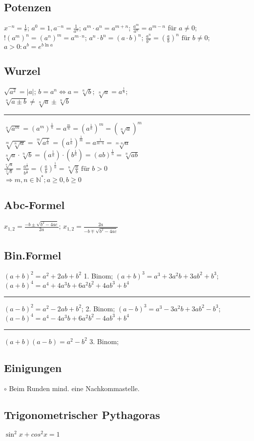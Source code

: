 \subsection{Potenzen}
$ x^{-n} = \frac{1}{^n} $; 
$ a^0 = 1, a^{-n} = \frac{1}{a^n} $; 
$ a^m \cdot a^n  = a^{m+n} $; 
$ \frac{a^m}{a^n} = a^{m-n} $ für $ a \ne 0 $; 
$ ! (a^m)^n = (a^n)^m = a^{m \cdot n} $; 
$ a^n \cdot b^n = (a \cdot b)^n $; 
$ \frac{a^n}{b^n} = (\frac{a}{b})^n \text{ für } b \ne  0 $; 
$ a >0 : a^b = e^{b \ln a} $

\subsection{Wurzel}
$ \sqrt{a ^2} = |a| $;
$ b = a^n  \Leftrightarrow a = \sqrt[n]{b}$; 
$ \sqrt[n]{a} = a^{\frac{1}{n}} $; \\
$ \sqrt[n]{a \pm b} \ne \sqrt[n]{a} \pm \sqrt[n]{b} $ \\
\hrule
$ \sqrt[n]{a^m} = (a^m)^{\frac{1}{n}} = a^{\frac{m}{n}} = (a^\frac{1}{n})^m = (\sqrt[n]{a})^m $ \\
$\sqrt[m]{\sqrt[n]{a}} = \sqrt[m]{a^{\frac{1}{n}}} = (a^{\frac{1}{n}})^{\frac{1}{m}} = a^{\frac{1}{m \cdot n}} = \sqrt[m \cdot n ]{a} $\\
$ \sqrt[n]{a} \cdot \sqrt[n]{b} = (a^{\frac{1}{n}}) \cdot (b^{\frac{1}{n}})  = (ab)^{\frac{1}{n}} = \sqrt[n]{ab} $\\
$ \frac{\sqrt[n]{a}}{\sqrt[n]{b}} = \frac{a^{\frac{1}{n}}}{b^{\frac{1}{n}}} = (\frac{a}{b})^{\frac{1}{n}} = \sqrt[n]{\frac{a}{b}} \text{ für } b > 0 $\\
$\Rightarrow m , n \in \mathbb{N}^*; a \ge  0, b \ge 0 $
\subsection{Abc-Formel}
$ x_{1,2} = \frac{-b \pm \sqrt{b^2 - 4ac}}{2a} $; 
$ x_{1,2} = \frac{2a}{-b \mp \sqrt{b^2 -4ac}} $
\subsection{Bin.Formel}
$ (a + b)^2 = a^2 + 2ab + b^2 $ 1. Binom;
$ (a+b)^3 = a^3 + 3a^2b + 3ab^2 + b^3 $; 
$ (a+b)^4 = a^4 + 4a^3b + 6a^2b^2 + 4ab^3 + b^4$
\hrule
$ (a-b)^2 = a^2 - 2ab + b^2 $; 2. Binom;
$ (a-b)^3 = a^3 - 3a^2b + 3ab^2 - b^3$; 
$ (a-b)^4 = a^4 - 4a^3b + 6a^2b^2 - 4ab^3 + b^4 $
\hrule
$ (a+b) (a-b) = a^2 - b^2 $ 3. Binom; 

\subsection{Einigungen}
	$\circ$ Beim Runden mind. eine Nachkommastelle.
\subsection{Trigonometrischer Pythagoras}
$ \sin^2 x + cos^2 x = 1 $